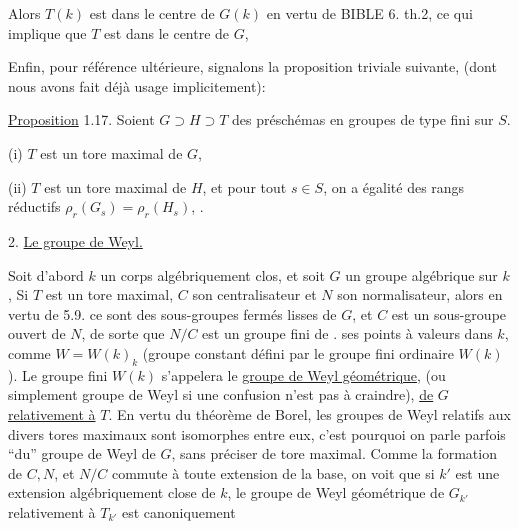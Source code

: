 Alors $T(k)$ est dans le centre de $G(k)$ en vertu de BIBLE 6. th.2, ce qui implique que $T$ est dans le centre de $G$, 

Enfin, pour référence ultérieure, signalons la proposition triviale suivante, (dont nous avons fait déjà usage implicitement):

\uline{Proposition} 1.17. Soient $G\supset H\supset T$ des préschémas en groupes de type fini sur $S$. 

(i)  $T$ est un tore maximal de $G$, 

(ii)  $T$ est un tore maximal de $H$, et  pour tout $s\in S$, on a égalité des rangs réductifs $\rho_r(G_s)=\rho_r(H_s)$, .

2. \uline{Le groupe de Weyl.}

Soit d'abord $k$ un corps algébriquement clos, et soit $G$ un groupe algébrique sur $k$,  Si $T$ est un tore maximal, $C$ son centralisateur et $N$ son normalisateur, alors en vertu de  5.9. ce sont des sous-groupes fermés lisses de $G$,  et $C$ est un sous-groupe ouvert de $N$, de sorte que  $N/C$ est un groupe fini  de . ses points à valeurs dans $k$, comme $W=W(k)_k$ (groupe constant défini par le groupe fini ordinaire $W(k)$). Le groupe fini $W(k)$ s'appelera le \uline{groupe de Weyl géométrique}, (ou simplement groupe de Weyl si une confusion n'est pas à craindre), \uline{de} $G$ \uline{relativement à} $T$. En vertu du théorème de  Borel, les groupes de Weyl relatifs aux divers tores maximaux sont isomorphes entre eux, c'est pourquoi on parle parfois ``du'' groupe de Weyl de $G$, sans préciser de tore maximal.  Comme la formation de $C,N$, et $N/C$ commute à toute extension de la base, on voit que si $k'$ est une extension algébriquement close de $k$, le groupe de Weyl géométrique de $G_{k'}$ relativement à $T_{k'}$ est canoniquement 
